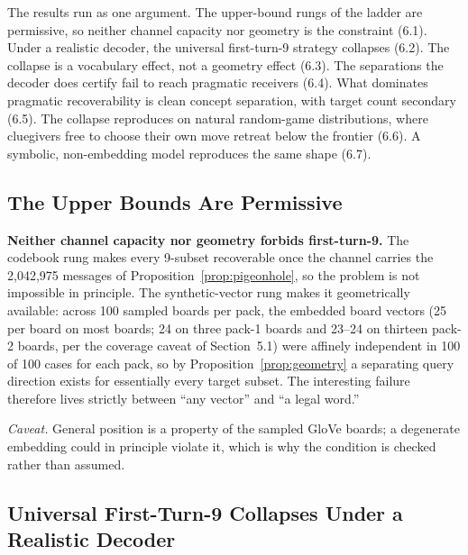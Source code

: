 \documentclass[11pt]{article}
\begin{document}
The results run as one argument. The upper-bound rungs of the ladder are
permissive, so neither channel capacity nor geometry is the constraint (6.1).
Under a realistic decoder, the universal first-turn-9 strategy collapses (6.2).
The collapse is a vocabulary effect, not a geometry effect (6.3). The separations
the decoder does certify fail to reach pragmatic receivers (6.4). What dominates
pragmatic recoverability is clean concept separation, with target count secondary
(6.5). The collapse reproduces on natural random-game distributions, where
cluegivers free to choose their own move retreat below the frontier (6.6). A
symbolic, non-embedding model reproduces the same shape (6.7).

\subsection{The Upper Bounds Are Permissive}

\textbf{Neither channel capacity nor geometry forbids first-turn-9.} The codebook
rung makes every 9-subset recoverable once the channel carries the 2,042,975
messages of Proposition~\ref{prop:pigeonhole}, so the problem is not impossible in
principle. The synthetic-vector rung makes it geometrically available: across 100
sampled boards per pack, the embedded board vectors (25 per board on most boards;
24 on three pack-1 boards and 23--24 on thirteen pack-2 boards, per the coverage
caveat of Section~5.1) were affinely independent in 100 of 100 cases for each
pack, so by Proposition~\ref{prop:geometry} a separating query direction exists
for essentially every target subset. The interesting failure therefore lives
strictly between ``any vector'' and ``a legal word.''

\emph{Caveat.} General position is a property of the sampled GloVe boards; a
degenerate embedding could in principle violate it, which is why the condition is
checked rather than assumed.

\subsection{Universal First-Turn-9 Collapses Under a Realistic Decoder}
\end{document}
